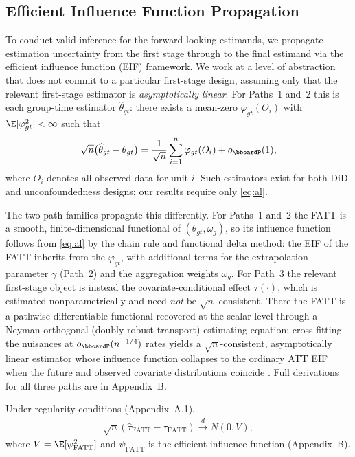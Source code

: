 \documentclass{article}
\renewcommand{\P}{\bboardP}
\begin{document}

\subsection{Efficient Influence Function Propagation}

To conduct valid inference for the forward-looking estimands, we propagate estimation uncertainty from the first stage through to the final estimand via the efficient influence function (EIF) framework. We work at a level of abstraction that does not commit to a particular first-stage design, assuming only that the relevant first-stage estimator is \emph{asymptotically linear}. For Paths~1 and~2 this is each group-time estimator $\widehat{\theta}_{gt}$: there exists a mean-zero $\varphi_{gt}(O_i)$ with $\E[\varphi_{gt}^2] < \infty$ such that
\begin{equation}
    \sqrt{n}\bigl(\widehat{\theta}_{gt} - \theta_{gt}\bigr) = \frac{1}{\sqrt{n}}\sum_{i=1}^{n} \varphi_{gt}(O_i) + o_{\P}(1), \label{eq:al}
\end{equation}
where $O_i$ denotes all observed data for unit $i$. Such estimators exist for both DiD \citep{callawayDifferenceindifferencesMultipleTime2021} and unconfoundedness designs; our results require only \eqref{eq:al}.

The two path families propagate this differently. For Paths~1 and~2 the FATT is a smooth, finite-dimensional functional of $(\theta_{gt}, \omega_g)$, so its influence function follows from \eqref{eq:al} by the chain rule and functional delta method: the EIF of the FATT inherits from the $\varphi_{gt}$, with additional terms for the extrapolation parameter $\gamma$ (Path~2) and the aggregation weights $\omega_g$. For Path~3 the relevant first-stage object is instead the covariate-conditional effect $\tau(\cdot)$, which is estimated nonparametrically and need \emph{not} be $\sqrt{n}$-consistent. There the FATT is a pathwise-differentiable functional recovered at the scalar level through a Neyman-orthogonal (doubly-robust transport) estimating equation: cross-fitting the nuisances at $o_\P(n^{-1/4})$ rates yields a $\sqrt{n}$-consistent, asymptotically linear estimator whose influence function collapses to the ordinary ATT EIF when the future and observed covariate distributions coincide \citep{chernozhukovDoubleDebiasedMachine2018}. Full derivations for all three paths are in Appendix~B.

\begin{theorem}
\label{thm:asymptotic}
Under regularity conditions (Appendix~A.1),
\begin{align}
\sqrt{n}(\hat{\tau}_{\text{FATT}} - \tau_{\text{FATT}}) \xrightarrow{d} N(0, V),
\end{align}
where $V = \E[\psi_{\text{FATT}}^2]$ and $\psi_{\text{FATT}}$ is the efficient influence function (Appendix~B).
\end{theorem}
\end{document}
